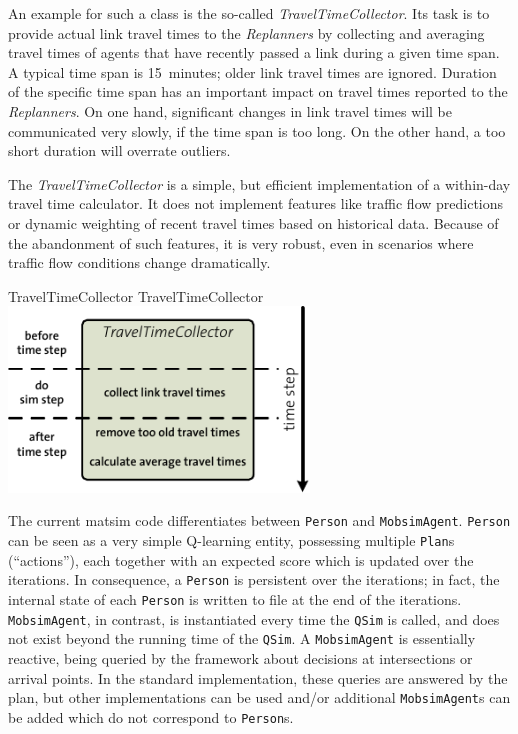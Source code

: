 An example for such a class is the so-called \emph{TravelTimeCollector}. Its task is to provide actual link travel times to the \emph{Replanners} by collecting and averaging travel times of agents that have recently passed a link during a given time span. A typical time span is 15~minutes; older link travel times are ignored. Duration of the specific time span has an important impact on travel times reported to the \emph{Replanners}. On one hand, significant changes in link travel times will be communicated very slowly, if the time span is too long. On the other hand, a too short duration will overrate outliers.

The \emph{TravelTimeCollector} is a simple, but efficient implementation of a within-day travel time calculator. It does not implement features like traffic flow predictions or dynamic weighting of recent travel times based on historical data. 
Because of the abandonment of such features, it is very robust, even in scenarios where traffic flow conditions change dramatically.

\createfigure%
{TravelTimeCollector}%
{TravelTimeCollector}%
{\label{fig:labelTravelTimeCollector}}%
{\includegraphics[width=8.0cm, angle=0]{extending/figures/WithinDayReplanning/TravelTimeCollector}}%
{}


The current \acrshort{matsim} code differentiates between \verb$Person$ and \verb$MobsimAgent$.  
%
\verb$Person$ can be seen as a very simple Q-learning entity, possessing multiple \verb$Plan$s (``actions''), each together with an expected score which is updated over the iterations.  In consequence, a \verb$Person$ is persistent over the iterations; in fact, the internal state of each \verb$Person$ is written to file at the end of the iterations.
%
\verb$MobsimAgent$, in contrast, is instantiated every time the \verb$QSim$ is called, and does not exist beyond the running time of the \verb$QSim$.  A \verb$MobsimAgent$ is essentially reactive, being queried by the framework about decisions at intersections or arrival points.  In the standard implementation, these queries are answered by the plan, but other implementations can be used and/or additional \verb$MobsimAgent$s can be added which do not correspond to \verb$Person$s.

